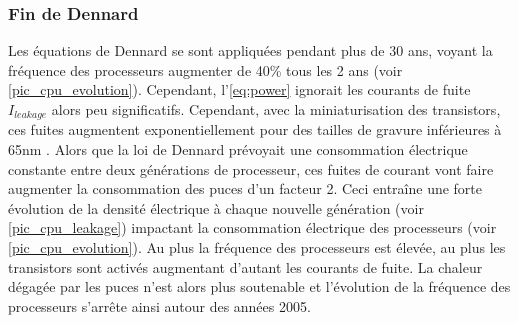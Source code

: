 \begin{table}[]
\centering
{}
\caption{ Résumé des impacts de la diminution de la finesse de gravure d'un facteur $\sqrt{2}$\protect\footnotemark.}
\label{tab:dennard}
\end{table}







\subsubsection{Fin de Dennard}
Les équations de Dennard se sont appliquées pendant plus de 30 ans, voyant la fréquence des processeurs augmenter de 40\% tous les 2 ans (voir \autoref{pic_cpu_evolution}). Cependant, l'\autoref{eq:power} ignorait les courants de fuite $I_{leakage}$ alors peu significatifs. Cependant, avec la miniaturisation des transistors, ces fuites augmentent exponentiellement pour des tailles de gravure inférieures à 65nm \cite{martin2014post}. Alors que la loi de Dennard prévoyait une consommation électrique constante entre deux générations de processeur, ces fuites de courant vont faire augmenter la consommation des puces d'un facteur 2. Ceci entraîne une forte évolution de la densité électrique à chaque nouvelle génération (voir \autoref{pic_cpu_leakage}) impactant la consommation électrique des processeurs (voir \autoref{pic_cpu_evolution}). Au plus la fréquence des processeurs est élevée, au plus les transistors sont activés augmentant d'autant les courants de fuite. La chaleur dégagée par les puces n'est alors plus soutenable et l'évolution de la fréquence des processeurs s'arrête ainsi autour des années 2005.

